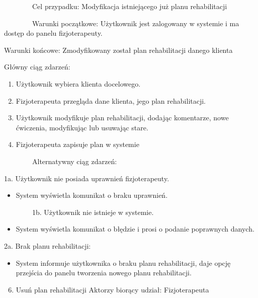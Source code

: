 {~~~~~~~~Cel przypadku: Modyfikacja istniejącego już planu
rehabilitacji}

{~~~~~~~~Warunki początkowe: Użytkownik jest zalogowany w systemie i ma
dostęp do panelu fizjoterapeuty.}

{Warunki końcowe: Zmodyfikowany został plan rehabilitacji danego
klienta}

{Główny ciąg zdarzeń:}

\begin{enumerate}
\tightlist
\item
  {Użytkownik wybiera klienta docelowego.}
\item
  {Fizjoterapeuta przegląda dane klienta, jego plan rehabilitacji.}
\item
  {Użytkownik modyfikuje plan rehabilitacji, dodając komentarze, nowe
  ćwiczenia, modyfikując lub usuwając stare.}
\item
  {Fizjoterapeuta zapisuje plan w systemie}
\end{enumerate}

{~~~~~~~~Alternatywny ciąg zdarzeń:}

{1a. Użytkownik nie posiada uprawnień fizjoterapeuty.}

\begin{itemize}
\tightlist
\item
  {System wyświetla komunikat o braku uprawnień.}
\end{itemize}

{~~~~~~~~1b. Użytkownik nie istnieje w systemie.}

\begin{itemize}
\tightlist
\item
  {System wyświetla komunikat o błędzie i prosi o podanie poprawnych
  danych.}
\end{itemize}

{2a. Brak planu rehabilitacji:}

\begin{itemize}
\tightlist
\item
  {System informuje użytkownika o braku planu rehabilitacji, daje opcję
  przejścia do panelu tworzenia nowego planu rehabilitacji.}
\end{itemize}

{}

{}

{}

{}

\begin{enumerate}
\setcounter{enumi}{5}
\tightlist
\item
  {Usuń plan rehabilitacji}{\hfill\break
  Aktorzy biorący udział: Fizjoterapeuta}
\end{enumerate}

